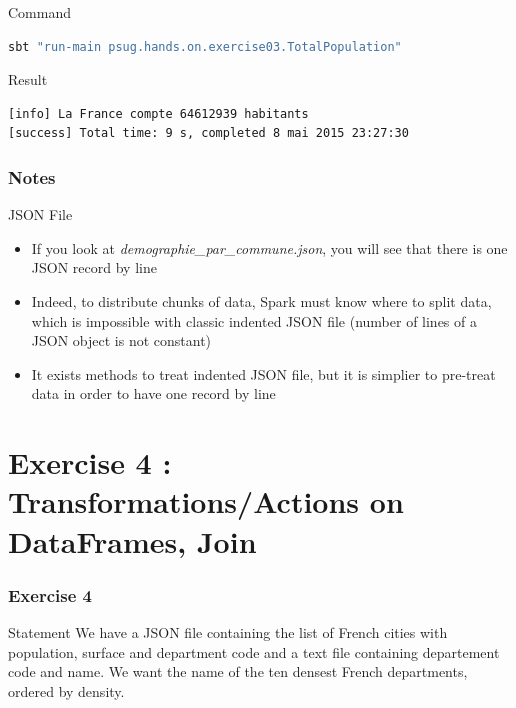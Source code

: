 \documentclass[slidetop,9pt,utf8]{beamer}
\begin{document}
\begin{CJK}{UTF8}{gbsn}
\begin{frame}[fragile]
  \begin{block}{Command}
    \begin{lstlisting}[language=bash, style=terminal-medium]
sbt "run-main psug.hands.on.exercise03.TotalPopulation"
    \end{lstlisting}
  \end{block}

  \begin{block}{Result}
    \begin{lstlisting}[language=bash, style=terminal]
[info] La France compte 64612939 habitants
[success] Total time: 9 s, completed 8 mai 2015 23:27:30
    \end{lstlisting}
  \end{block}

\end{frame}

\begin{frame}
  \frametitle{Notes}

  \begin{exampleblock}{JSON File}
    \begin{itemize}
      \item If you look at \textit{demographie\_par\_commune.json}, you will see that there is one JSON record by line
      \item Indeed, to distribute chunks of data, Spark must know where to split data, which is impossible with classic indented JSON file (number of lines of a JSON object is not constant)
      \item It exists methods to treat indented JSON file, but it is simplier to pre-treat data in order to have one record by line
    \end{itemize}
  \end{exampleblock}

\end{frame}

%
%
%
%

\section{Exercise 4 : Transformations/Actions on DataFrames, Join}

\begin{frame}
  \frametitle{Exercise 4}

  \begin{block}{Statement}
    We have a JSON file containing the list of French cities with population, surface and department code and a text file containing departement code and name. We want the name of the ten densest French departments, ordered by density.
  \end{block}


\end{frame}
\end{CJK}
\end{document}
